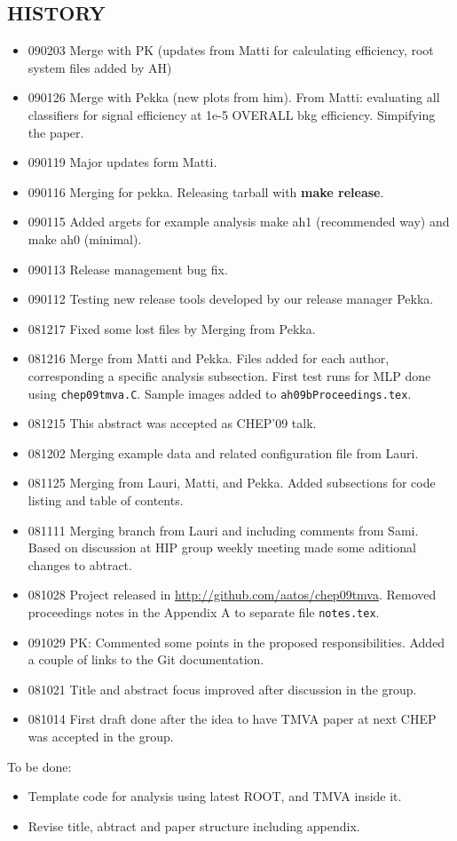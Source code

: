 \begin{appendix}
\section{HISTORY}
\begin{itemize}
\item 090203 Merge with PK (updates from Matti for calculating efficiency, 
              root system files added by AH)
\item 090126 Merge with Pekka (new plots from him). 
             From Matti: evaluating all classifiers for signal efficiency 
             at 1e-5 OVERALL bkg efficiency. Simpifying the paper.
\item 090119 Major updates form Matti.
\item 090116 Merging for pekka. Releasing tarball with {\bf make release}.
\item 090115 Added argets for example analysis make ah1 (recommended way) and make ah0 (minimal).
\item 090113 Release management bug fix.
\item 090112 Testing new release tools developed by our release manager Pekka.
\item 081217 Fixed some lost files by Merging from Pekka.
\item 081216 Merge from Matti and Pekka. 
Files added for each author, corresponding a specific analysis subsection.
First test runs for MLP done using {\tt chep09tmva.C}. Sample images added to {\tt ah09bProceedings.tex}.
\item 081215 This abstract was accepted as CHEP'09 talk.
\item 081202 Merging example data and related configuration file from Lauri.
\item 081125 Merging from Lauri, Matti, and Pekka. 
Added subsections for code listing and table of contents.
\item 081111 Merging branch from Lauri and including comments from Sami. 
Based on discussion at HIP group weekly meeting made some aditional changes to abtract.
\item 081028 Project released in \url{http://github.com/aatos/chep09tmva}. Removed proceedings notes in the Appendix A to separate file {\tt notes.tex}.
\item 091029 PK: Commented some points in the proposed
  responsibilities. Added a couple of links to the Git documentation.
\item 081021 Title and abstract focus improved after discussion in the group. 
\item 081014 First draft done after the idea to have TMVA paper at next CHEP was accepted in the group.
\end{itemize}


To be done:
\begin{itemize}
\item Template code for  analysis using latest ROOT, and TMVA inside it.
\item Revise title, abtract and paper structure including appendix.
\end{itemize}

\end{appendix}
